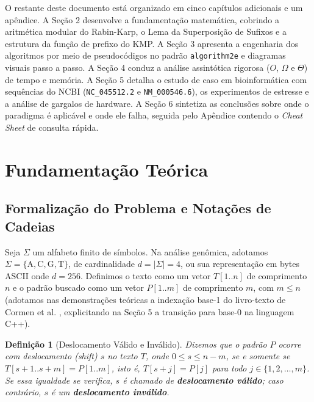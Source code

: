 \documentclass[12pt,a4paper]{article}
\newtheorem{definicao}{Defini\c{c}\~ao}[section]
\begin{document}
O restante deste documento est\'a organizado em cinco cap\'itulos adicionais e um ap\^endice. A Se\c{c}\~ao 2 desenvolve a fundamenta\c{c}\~ao matem\'atica, cobrindo a aritm\'etica modular do Rabin-Karp, o Lema da Superposi\c{c}\~ao de Sufixos e a estrutura da fun\c{c}\~ao de prefixo do KMP. A Se\c{c}\~ao 3 apresenta a engenharia dos algoritmos por meio de pseudoc\'odigos no padr\~ao \texttt{algorithm2e} e diagramas visuais passo a passo. A Se\c{c}\~ao 4 conduz a an\'alise assint\'otica rigorosa ($O$, $\Omega$ e $\Theta$) de tempo e mem\'oria. A Se\c{c}\~ao 5 detalha o estudo de caso em bioinform\'atica com sequ\^encias do NCBI (\texttt{NC\_045512.2} e \texttt{NM\_000546.6}), os experimentos de estresse e a an\'alise de gargalos de hardware. A Se\c{c}\~ao 6 sintetiza as conclus\~oes sobre onde o paradigma \'e aplic\'avel e onde ele falha, seguida pelo Ap\^endice contendo o \textit{Cheat Sheet} de consulta r\'apida.

\section{Fundamenta\c{c}\~ao Te\'orica}

\subsection{Formaliza\c{c}\~ao do Problema e Nota\c{c}\~oes de Cadeias}

Seja $\Sigma$ um alfabeto finito de s\'imbolos. Na an\'alise gen\^omica, adotamos $\Sigma = \{\text{A}, \text{C}, \text{G}, \text{T}\}$, de cardinalidade $d = |\Sigma| = 4$, ou sua representa\c{c}\~ao em bytes ASCII onde $d = 256$. Definimos o texto como um vetor $T[1..n]$ de comprimento $n$ e o padr\~ao buscado como um vetor $P[1..m]$ de comprimento $m$, com $m \le n$ (adotamos nas demonstra\c{c}\~oes te\'oricas a indexa\c{c}\~ao base-1 do livro-texto de Cormen et al. \cite{cormen2022}, explicitando na Se\c{c}\~ao 5 a transi\c{c}\~ao para base-0 na linguagem C++).

\begin{definicao}[Deslocamento V\'alido e Inv\'alido]
Dizemos que o padr\~ao $P$ ocorre com deslocamento (\textit{shift}) $s$ no texto $T$, onde $0 \le s \le n-m$, se e somente se $T[s+1..s+m] = P[1..m]$, isto \'e, $T[s+j] = P[j]$ para todo $j \in \{1, 2, \dots, m\}$. Se essa igualdade se verifica, $s$ \'e chamado de \textbf{deslocamento v\'alido}; caso contr\'ario, $s$ \'e um \textbf{deslocamento inv\'alido}.
\end{definicao}
\end{document}
